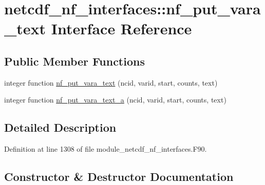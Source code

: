 \hypertarget{interfacenetcdf__nf__interfaces_1_1nf__put__vara__text}{}\section{netcdf\+\_\+nf\+\_\+interfaces\+:\+:nf\+\_\+put\+\_\+vara\+\_\+text Interface Reference}
\label{interfacenetcdf__nf__interfaces_1_1nf__put__vara__text}
\subsection*{Public Member Functions}
\begin{DoxyCompactItemize}
\item 
integer function \hyperlink{interfacenetcdf__nf__interfaces_1_1nf__put__vara__text_a07fd6ecddf971d8cbf689e87781749af}{nf\+\_\+put\+\_\+vara\+\_\+text} (ncid, varid, start, counts, text)
\item 
integer function \hyperlink{interfacenetcdf__nf__interfaces_1_1nf__put__vara__text_a85f011ce2c04d85ee3fc94dbdabc77d7}{nf\+\_\+put\+\_\+vara\+\_\+text\+\_\+a} (ncid, varid, start, counts, text)
\end{DoxyCompactItemize}


\subsection{Detailed Description}


Definition at line 1308 of file module\+\_\+netcdf\+\_\+nf\+\_\+interfaces.\+F90.



\subsection{Constructor \& Destructor Documentation}
\mbox{\label{interfacenetcdf__nf__interfaces_1_1nf__put__vara__text_a07fd6ecddf971d8cbf689e87781749af}} 

